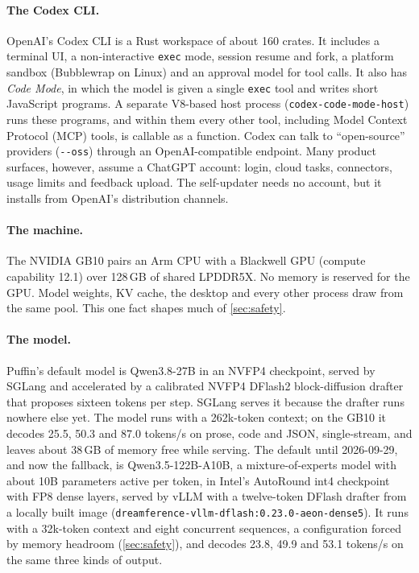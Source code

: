 \documentclass[11pt]{article}
\newcommand{\code}[1]{\texttt{#1}}
\begin{document}
\paragraph{The Codex CLI.} OpenAI's Codex CLI \cite{openai2026codex} is a Rust workspace of about
160 crates. It includes a terminal UI, a non-interactive \code{exec} mode, session
resume and fork, a platform sandbox (Bubblewrap on Linux) and an approval model for tool calls. It
also has \emph{Code Mode}, in which the model is given a single \code{exec} tool and writes short
JavaScript programs. A separate V8-based host process (\code{codex-code-mode-host}) runs these
programs, and within them every other tool, including Model Context Protocol (MCP)
\cite{mcp2025spec} tools, is callable as a function. Codex can talk to ``open-source'' providers
(\code{-{}-oss}) through an OpenAI-compatible endpoint. Many product surfaces, however, assume a
ChatGPT account: login, cloud tasks, connectors, usage limits and feedback upload. The
self-updater needs no account, but it installs from OpenAI's distribution channels.

\paragraph{The machine.} The NVIDIA GB10 pairs an Arm CPU with a Blackwell GPU (compute capability
12.1) over 128\,GB of shared LPDDR5X. No memory is reserved for the GPU. Model weights, KV cache,
the desktop and every other process draw from the same pool. This one fact shapes much of
\cref{sec:safety}.

\paragraph{The model.} Puffin's default model is Qwen3.8-27B in an NVFP4 checkpoint, served by
SGLang and accelerated by a calibrated NVFP4 DFlash2 block-diffusion drafter
\cite{chen2026dflash,dflashdrafter} that proposes sixteen tokens per step. SGLang serves it
because the drafter runs nowhere else yet. The model runs with a 262k-token context; on the GB10 it
decodes 25.5, 50.3 and 87.0 tokens/s on prose, code and JSON, single-stream, and leaves about
38\,GB of memory free while serving. The default until 2026-09-29, and now the fallback, is
Qwen3.5-122B-A10B, a mixture-of-experts model with about 10B parameters active per token, in
Intel's AutoRound int4 checkpoint \cite{qwen35int4,cheng2023autoround} with FP8 dense layers,
served by vLLM \cite{kwon2023vllm} with a twelve-token DFlash drafter from a locally built image
(\code{dreamference-vllm-dflash:0.23.0-aeon-dense5}). It runs with a 32k-token context and eight
concurrent sequences, a configuration forced by memory headroom (\cref{sec:safety}), and decodes
23.8, 49.9 and 53.1 tokens/s on the same three kinds of output.
\end{document}

